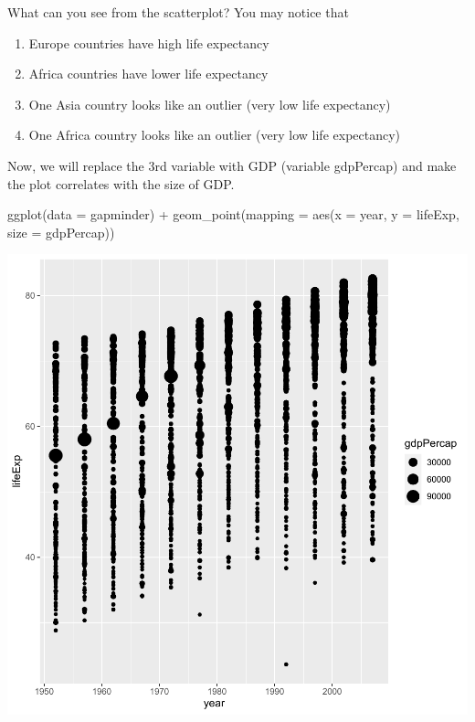 \documentclass[
]{book}
\makeatletter
\newenvironment{Shaded}{\begin{snugshade}}{\end{snugshade}}
\newcommand{\AttributeTok}[1]{\textcolor[rgb]{0.61,0.61,0.61}{#1}}
\newcommand{\FunctionTok}[1]{\textcolor[rgb]{0,0,0}{#1}}
\newcommand{\NormalTok}[1]{#1}
\newcommand{\SpecialCharTok}[1]{\textcolor[rgb]{0,0,0}{#1}}
\providecommand{\tightlist}{%
  \setlength{\itemsep}{0pt}\setlength{\parskip}{0pt}}
\newenvironment{kframe}{%
\medskip{}
\setlength{\fboxsep}{.8em}
 \def\at@end@of@kframe{}%
 \ifinner\ifhmode%
  \def\at@end@of@kframe{\end{minipage}}%
  \begin{minipage}{\columnwidth}%
 \fi\fi%
 \def\FrameCommand##1{\hskip\@totalleftmargin \hskip-\fboxsep
 \colorbox{shadecolor}{##1}\hskip-\fboxsep
     \hskip-\linewidth \hskip-\@totalleftmargin \hskip\columnwidth}%
 \MakeFramed {\advance\hsize-\width
   \@totalleftmargin\z@ \linewidth\hsize
   \@setminipage}}%
 {\par\unskip\endMakeFramed%
 \at@end@of@kframe}
\renewenvironment{Shaded}{\begin{kframe}}{\end{kframe}}
\makeatother
\begin{document}
What can you see from the scatterplot? You may notice that

\begin{enumerate}
\def\labelenumi{\arabic{enumi}.}
\tightlist
\item
  Europe countries have high life expectancy
\item
  Africa countries have lower life expectancy
\item
  One Asia country looks like an outlier (very low life expectancy)
\item
  One Africa country looks like an outlier (very low life expectancy)
\end{enumerate}

Now, we will replace the 3rd variable with GDP (variable gdpPercap) and make the plot correlates with the size of GDP.

\begin{Shaded}
\begin{Highlighting}[]
\FunctionTok{ggplot}\NormalTok{(}\AttributeTok{data =}\NormalTok{ gapminder) }\SpecialCharTok{+}
  \FunctionTok{geom\_point}\NormalTok{(}\AttributeTok{mapping =} \FunctionTok{aes}\NormalTok{(}\AttributeTok{x =}\NormalTok{ year, }\AttributeTok{y =}\NormalTok{ lifeExp, }\AttributeTok{size =}\NormalTok{ gdpPercap))}
\end{Highlighting}
\end{Shaded}

\begin{center}\includegraphics[width=0.7\linewidth,keepaspectratio]{Multivariable_Data_Analysis_files/figure-latex/unnamed-chunk-19-1} \end{center}
\end{document}
